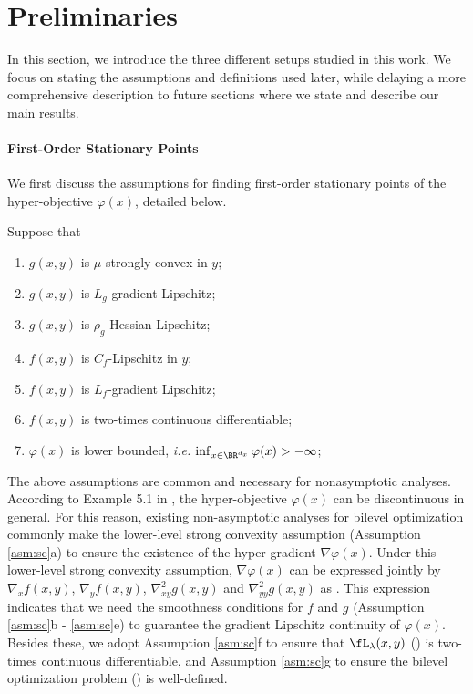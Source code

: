 \documentclass{article}
\begin{document}
\section{Preliminaries}

In this section, we introduce the three different setups studied in this work. We focus on stating the assumptions and definitions used later, while delaying a more comprehensive description to future sections where we state and describe our main results.

\paragraph{First-Order Stationary Points} 

We first discuss the assumptions for finding first-order stationary points of the hyper-objective $\varphi(x)$, detailed below.

\begin{asm} \label{asm:sc}
Suppose that
\begin{enumerate}[label=\alph*.]
    \item $g(x,y)$ is $\mu$-strongly convex in $y$;
     \item $g(x,y)$ is $L_g$-gradient Lipschitz;
    \item $g(x,y)$ is $\rho_g$-Hessian Lipschitz;
     \item $f(x,y)$ is $C_f$-Lipschitz in $y$;
    \item $f(x,y)$ is $L_f$-gradient Lipschitz;
    \item $f(x,y)$ is two-times continuous differentiable;
    \item $\varphi(x)$ is lower bounded, \emph{i.e.} $\inf_{x \in \BR^{d_x}} \varphi(x) > - \infty$;
\end{enumerate}
\end{asm}

The above assumptions are common and necessary for nonasymptotic analyses. According to Example 5.1 in \citep{chen2023bilevel},
the hyper-objective $\varphi(x)$ can be discontinuous in general. For this reason, existing non-asymptotic analyses for bilevel optimization commonly make the 
lower-level strong convexity assumption (Assumption \ref{asm:sc}a)
 to ensure the existence of the hyper-gradient $\nabla \varphi(x)$. Under this lower-level strong convexity assumption,  $\nabla \varphi(x)$ can be expressed jointly by $ \nabla_x f(x,y)$, $\nabla_y f(x,y)$, $\nabla_{xy}^2 g(x,y)$ and $ \nabla_{yy}^2 g(x,y)$ as .
This expression indicates that we need the smoothness conditions for $f$ and $g$ (Assumption \ref{asm:sc}b - \ref{asm:sc}e) to guarantee the gradient  Lipschitz continuity of $ \varphi(x)$. 
Besides these, 
we adopt Assumption \ref{asm:sc}f to ensure that $ \fL_{\lambda}(x,y)$ () is two-times continuous differentiable, and
Assumption \ref{asm:sc}g to ensure the bilevel optimization problem () is well-defined. 
\end{document}
